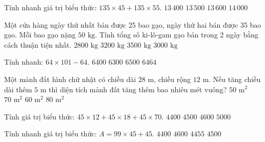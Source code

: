 \begin{ex} %
Tính nhanh giá trị biểu thức: $135 \times 45 + 135 \times 55$.
\choice
{$13\,400$}
{\True $13\,500$}
{$13\,600$}
{$14\,000$}
\end{ex}

\begin{ex} %
Một cửa hàng ngày thứ nhất bán được 25 bao gạo, ngày thứ hai bán được 35 bao gạo. Mỗi bao gạo nặng $50\text{ kg}$. Tính tổng số ki-lô-gam gạo bán trong 2 ngày bằng cách thuận tiện nhất.
\choice
{$2800\text{ kg}$}
{$3200\text{ kg}$}
{$3500\text{ kg}$}
{\True $3000\text{ kg}$}
\end{ex}

\begin{ex} %
Tính nhanh: $64 \times 101 - 64$.
\choice
{\True $6400$}
{$6300$}
{$6500$}
{$6464$}
\end{ex}

\begin{ex} %
Một mảnh đất hình chữ nhật có chiều dài $28\text{ m}$, chiều rộng $12\text{ m}$. Nếu tăng chiều dài thêm $5\text{ m}$ thì diện tích mảnh đất tăng thêm bao nhiêu mét vuông?
\choice
{$50\text{ m}^2$}
{$70\text{ m}^2$}
{\True $60\text{ m}^2$}
{$80\text{ m}^2$}
\end{ex}

\begin{ex} %
Tính giá trị biểu thức: $45 \times 12 + 45 \times 18 + 45 \times 70$.
\choice
{$4400$}
{\True $4500$}
{$4600$}
{$5000$}
\end{ex}

\begin{ex} %
Tính nhanh giá trị biểu thức: $A = 99 \times 45 + 45$.
\choice
{$4400$}
{$4600$}
{$4455$}
{\True $4500$}
\end{ex}

